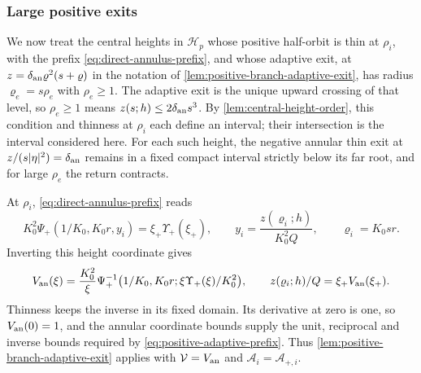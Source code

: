 \subsubsection{Large positive exits}

We now treat the central heights in \(\mathcal H_p\) whose positive
half-orbit is thin at \(\rho_i\), with the prefix
\eqref{eq:direct-annulus-prefix}, and whose adaptive exit, at
\(z=\delta_{\rm an}\varrho^2(s+\varrho)\) in the notation of
\cref{lem:positive-branch-adaptive-exit}, has radius
\(\varrho_e=s\rho_e\) with \(\rho_e\ge1\). The adaptive exit is the
unique upward crossing of that level, so \(\rho_e\ge1\) means
\(z(s;h)\le2\delta_{\rm an}s^3\). By \cref{lem:central-height-order},
this condition and thinness at \(\rho_i\) each define an interval;
their intersection is the interval considered here. For each such height,
the negative annular thin exit at \(z/(s|\eta|^2)=\delta_{\rm an}\) remains
in a fixed compact interval strictly below its far root, and for large
\(\rho_e\) the return contracts.

At \(\rho_i\), \eqref{eq:direct-annulus-prefix} reads
\[
 K_0^2\Psi_+(1/K_0,K_0r,y_i)=\xi_+\Upsilon_+(\xi_+),\qquad
 y_i=\frac{z(\varrho_i;h)}{K_0^2Q},\qquad \varrho_i=K_0sr .
\]
Inverting this height coordinate gives
\[
 V_{\rm an}(\xi)=\frac{K_0^2}{\xi}
   \Psi_+^{-1}\bigl(1/K_0,K_0r;\xi\Upsilon_+(\xi)/K_0^2\bigr),
 \qquad z(\varrho_i;h)/Q=\xi_+V_{\rm an}(\xi_+).
\]
Thinness keeps the inverse in its fixed domain. Its derivative at zero
is one, so \(V_{\rm an}(0)=1\), and the annular coordinate bounds
supply the unit, reciprocal and inverse bounds required by
\eqref{eq:positive-adaptive-prefix}. Thus
\cref{lem:positive-branch-adaptive-exit} applies with
\(\mathcal V=V_{\rm an}\) and \(\mathcal A_i=\mathcal A_{+,i}\).

